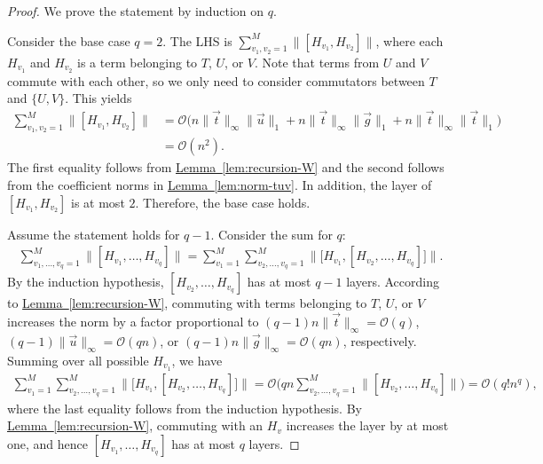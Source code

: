 \documentclass[11pt]{article}
\newcommand{\lem}[1]{\hyperref[lem:#1]{Lemma~\ref*{lem:#1}}}
\begin{document}
\begin{proof}
    We prove the statement by induction on $q$. 
    
    Consider the base case $q=2$. The LHS is $\sum_{v_1, v_2=1}^{M} \|[H_{v_1}, H_{v_2}]\|$, where each $H_{v_1}$ and $H_{v_2}$ is a term belonging to $T$, $U$, or $V$. Note that terms from $U$ and $V$ commute with each other, so we only need to consider commutators between $T$ and $\{U,V\}$. This yields
    \begin{align*}
        \sum_{v_1, v_2=1}^{M} \|[H_{v_1}, H_{v_2}]\| 
        &= \mathcal{O}\big(n\|\vec{t}\|_{\infty} \|\vec{u}\|_1+ n\|\vec{t}\|_{\infty} \|\vec{g}\|_1 + n\|\vec{t}\|_{\infty} \|\vec{t}\|_1\big) \\
        &= \mathcal{O}(n^2).
    \end{align*}
    The first equality follows from \lem{recursion-W} and the second follows from the coefficient norms in \lem{norm-tuv}. In addition, the layer of $[H_{v_1}, H_{v_2}]$ is at most $2$. Therefore, the base case holds. 
    
    Assume the statement holds for $q-1$. Consider the sum for $q$: 
    \begin{align*}
         \sum_{v_1, \ldots, v_q=1}^{M} \|[H_{v_1}, \ldots, H_{v_q}]\| = \sum_{v_1=1}^M  \sum_{v_2, \ldots, v_q=1}^{M} \Big\| \big[H_{v_1}, [H_{v_2}, \ldots, H_{v_q}] \big] \Big\|. 
    \end{align*} 
    By the induction hypothesis, $[H_{v_2}, \ldots, H_{v_q}]$ has at most $q-1$ layers.
    According to \lem{recursion-W}, commuting with terms belonging to $T$, $U$, or $V$ increases the norm by a factor proportional to $(q-1)n\|\vec{t}\|_\infty = \mathcal{O}(q)$, $(q-1)\|\vec{u}\|_\infty =\mathcal{O}(qn)$, or $(q-1)n\|\vec{g}\|_\infty=\mathcal{O}(qn)$, respectively. Summing over all possible $H_{v_1}$, we have
    \begin{align*}
        \sum_{v_1=1}^M \sum_{v_2, \ldots, v_q=1}^{M} \Big\| \big[H_{v_1}, [H_{v_2}, \ldots, H_{v_q}] \big] \Big\| 
        = \mathcal{O}\Big(qn \sum_{v_2, \ldots, v_q=1}^{M} \|[H_{v_2}, \ldots, H_{v_q}]\|\Big) 
        = \mathcal{O}(q!n^{q}),
    \end{align*}
    where the last equality follows from the induction hypothesis. By \lem{recursion-W}, commuting with an $H_v$ increases the layer by at most one, and hence $[H_{v_1}, \ldots, H_{v_q}]$ has at most $q$ layers.
\end{proof}
\end{document}
